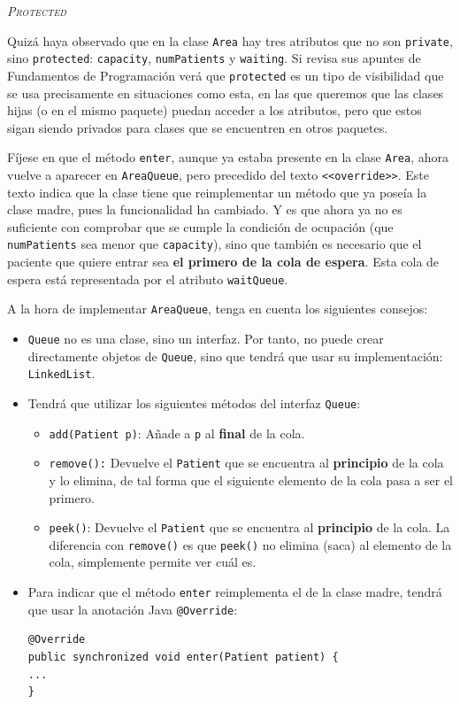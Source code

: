\documentclass[10pt,a4paper,spanish]{article}
\newcommand{\sombreado}[2]{
  \begin{shaded}
    \begin{center} \emph{\textsc{#1}} \end{center}
    \noindent #2\\
  \end{shaded}
}
\newcommand{\code}[1]{\texttt{#1}}
\begin{document}
\sombreado{Protected}{Quizá haya observado que en la clase \code{Area} hay tres atributos que no son \code{private}, sino \code{protected}: \code{capacity}, \code{numPatients} y \code{waiting}. Si revisa sus apuntes de Fundamentos de Programación verá que \code{protected} es un tipo de visibilidad que se usa precisamente en situaciones como esta, en las que queremos que las clases hijas (o en el mismo paquete) puedan acceder a los atributos, pero que estos sigan siendo privados para clases que se encuentren en otros paquetes.}

Fíjese en que el método \code{enter}, aunque ya estaba presente en la clase \code{Area}, ahora vuelve a aparecer en \code{AreaQueue}, pero precedido del texto \code{<<override>>}. Este texto indica que la clase tiene que reimplementar un método que ya poseía la clase madre, pues la funcionalidad ha cambiado. Y es que ahora ya no es suficiente con comprobar que se cumple la condición de ocupación (que \code{numPatients} sea menor que \code{capacity}), sino que también es necesario que el paciente que quiere entrar sea \textbf{el primero de la cola de espera}. Esta cola de espera está representada por el atributo \code{waitQueue}.

A la hora de implementar \code{AreaQueue}, tenga en cuenta los siguientes consejos:

\begin{itemize}
    \item \code{Queue} no es una clase, sino un interfaz. Por tanto, no puede crear directamente objetos de \code{Queue}, sino que tendrá que usar su implementación: \code{LinkedList}.
    \item Tendrá que utilizar los siguientes métodos del interfaz \code{Queue}:
    \begin{itemize}
        \item \code{add(Patient p)}: Añade a \code{p} al \textbf{final} de la cola.
        \item \code{remove():} Devuelve el \code{Patient} que se encuentra al \textbf{principio} de la cola y lo elimina, de tal forma que el siguiente elemento de la cola pasa a ser el primero.
        \item \code{peek()}: Devuelve el \code{Patient} que se encuentra al \textbf{principio} de la cola. La diferencia con \code{remove()} es que \code{peek()} no elimina (saca) al elemento de la cola, simplemente permite ver cuál es.
    \end{itemize}
    \item Para indicar que el método \code{enter} reimplementa el de la clase madre, tendrá que usar la anotación Java \code{@Override}:
\begin{verbatim}
@Override
public synchronized void enter(Patient patient) {
...
}
\end{verbatim}
\end{itemize}
\end{document}
